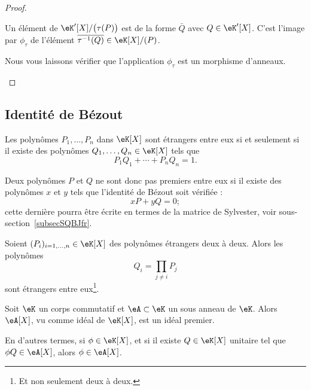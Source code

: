 \begin{proof}
\begin{subproof}
		\spitem[Surjection]

		Un élément de \( \eK'[X]/\big( \tau(P) \big)\) est de la forme \( \bar Q\) avec \( Q\in \eK'[X]\). C'est l'image par \( \phi_{\tau}\) de l'élément \( \overline{ \tau^{-1}(Q) }\in \eK[X]/(P)\).

		\spitem[Morphisme]

		Nous vous laissons vérifier que l'application \( \phi_{\tau}\) est un morphisme d'anneaux.

	\end{subproof}
\end{proof}

\subsection{Identité de Bézout}

\begin{theorem}[Bézout] \label{ThoBezoutOuGmLB}
	Les polynômes \( P_1,\ldots,P_n\) dans \( \eK[X]\) sont étrangers entre eux si et seulement si il existe des polynômes \( Q_1,\ldots,Q_n\in\eK[X]\) tels que
	\begin{equation}
		P_1Q_1+\cdots+P_nQ_n=1.
	\end{equation}
\end{theorem}

Deux polynômes \( P\) et \( Q\) ne sont donc pas premiers entre eux si il existe des polynômes \( x\) et \( y\) tels que l'identité de Bézout soit vérifiée :
\begin{equation}    \label{EqkbbzAi}
	xP+yQ=0;
\end{equation}
cette dernière pourra être écrite en termes de la matrice de Sylvester, voir sous-section~\ref{subsecSQBJfr}.

\begin{lemma}       \label{LemuALZHn}
	Soient \( (P_i)_{i=1,\ldots,n}\in \eK[X]\) des polynômes étrangers deux à deux. Alors les polynômes \begin{equation} Q_i=\prod_{j\neq i}P_j \end{equation}
	sont étrangers entre eux\footnote{Et non seulement deux à deux.}.
\end{lemma}

\begin{lemma}   \label{LemzwkYdn}
	Soit \( \eK\) un corps commutatif et \( \eA\subset \eK\) un sous
	anneau de \( \eK\).  Alors \( \eA[X] \), vu comme idéal de \( \eK[X]
	\), est un idéal premier.

	En d'autres termes, si \( \phi\in \eK[X]\), et si il existe \( Q\in \eK[X]\) unitaire tel que \( \phi Q\in \eA[X]\), alors \( \phi\in \eA[X]\).
\end{lemma}

